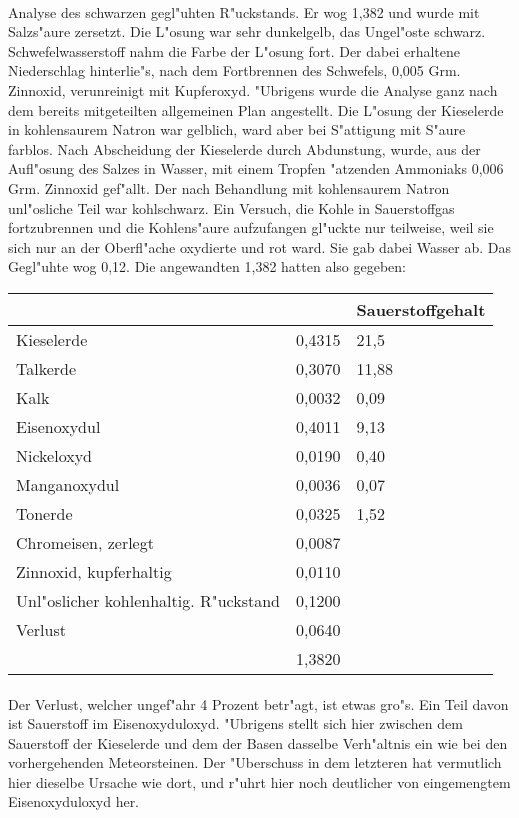 \documentclass[a4paper, 11pt, oneside]{article}
\begin{document}
\paragraph{}
Analyse des schwarzen gegl"uhten R"uckstands. Er wog 1,382 und wurde mit Salzs"aure zersetzt. Die L"osung war sehr dunkelgelb, das Ungel"oste schwarz. Schwefelwasserstoff nahm die Farbe der L"osung fort. Der dabei erhaltene Niederschlag hinterlie"s, nach dem Fortbrennen des Schwefels, 0,005 Grm. Zinnoxid, verunreinigt mit Kupferoxyd. "Ubrigens wurde die Analyse ganz nach dem bereits mitgeteilten allgemeinen Plan angestellt. Die L"osung der Kieselerde in kohlensaurem Natron war gelblich, ward aber bei S"attigung mit S"aure farblos. Nach Abscheidung der Kieselerde durch Abdunstung, wurde, aus der Aufl"osung des Salzes in Wasser, mit einem Tropfen "atzenden Ammoniaks 0,006 Grm. Zinnoxid gef"allt. Der nach Behandlung mit kohlensaurem Natron unl"osliche Teil war kohlschwarz. Ein Versuch, die Kohle in Sauerstoffgas fortzubrennen und die Kohlens"aure aufzufangen gl"uckte nur teilweise, weil sie sich nur an der Oberfl"ache oxydierte und rot ward. Sie gab dabei Wasser ab. Das Gegl"uhte wog 0,12. Die angewandten 1,382 hatten also gegeben:
\begin{center}
\begin{tabular}{ |p{35mm}|p{20mm}|p{35mm}| }
    \hline
     &  & Sauerstoffgehalt\\\hline
    Kieselerde & 0,4315 & 21,5\\\hline
    Talkerde & 0,3070 & 11,88\\\hline
    Kalk & 0,0032 & 0,09\\\hline
    Eisenoxydul & 0,4011 & 9,13\\\hline
    Nickeloxyd & 0,0190 & 0,40\\\hline
    Manganoxydul & 0,0036 & 0,07\\\hline
    Tonerde & 0,0325 & 1,52\\\hline
    Chromeisen, zerlegt & 0,0087 & \\\hline
    Zinnoxid, kupferhaltig & 0,0110 & \\\hline
    Unl"oslicher kohlenhaltig. R"uckstand & 0,1200 & \\\hline
    Verlust & 0,0640 & \\\hline
     & 1,3820 & \\
    \hline
\end{tabular}
\end{center}
\paragraph{}
Der Verlust, welcher ungef"ahr 4 Prozent betr"agt, ist etwas gro"s. Ein Teil davon ist Sauerstoff im Eisenoxyduloxyd. "Ubrigens stellt sich hier zwischen dem Sauerstoff der Kieselerde und dem der Basen dasselbe Verh"altnis ein wie bei den vorhergehenden Meteorsteinen. Der "Uberschuss in dem letzteren hat vermutlich hier dieselbe Ursache wie dort, und r"uhrt hier noch deutlicher von eingemengtem Eisenoxyduloxyd her.
\end{document}
